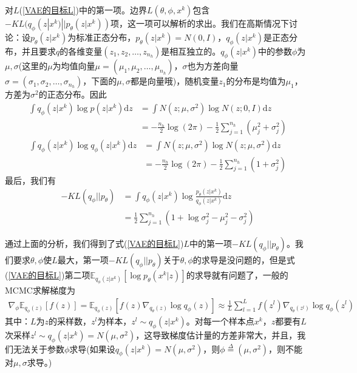            \par
            对$L$(\ref{VAE的目标L})中的第一项。边界$L(\theta,\phi,x^k)$包含$-KL(q_\phi(z|x^k)||p_\theta(z|x^k))$项，这一项可以解析的求出。我们在高斯情况下讨论：设$p_\theta(z|x^k)$为标准正态分布，$p_\theta(z|x^k) = N(0,I)$，$q_\phi(z|x^k)$是正态分布，并且要求$q$的各维变量$(z_1,z_2,\dots,z_{n_h})$是相互独立的。$q_\phi(z|x^k)$中的参数$\phi$为$\mu,\sigma$(这里的$\mu$为均值向量$\mu=(\mu_1,\mu_2,\dots,\mu_{n_h})$，$\sigma$也为方差向量$\sigma=(\sigma_1,\sigma_2,\dots,\sigma_{n_h})$，下面的$\mu,\sigma$都是向量哦)，随机变量$z_1$的分布是均值为$\mu_1$，方差为$\sigma^2$的正态分布。因此
            \begin{align*}
            \int q_\phi(z|x^k) \log p(z|x^k)\mathrm{d}z &= \int N(z;\mu,\sigma^2)\log N(z;0,I)\mathrm{d}z\\
            &= -\frac{n_h}{2} \log(2\pi) - \frac{1}{2} \sum_{j=1}^{n_h}(\mu_j^2+\sigma_j^2)
            \end{align*}
            \begin{align*}
            \int q_\phi(z|x^k) \log q_\phi(z|x^k)\mathrm{d}z &= \int N(z;\mu,\sigma^2)\log N(z;\mu,\sigma^2)\mathrm{d}z\\
            &= -\frac{n_h}{2} \log(2\pi) - \frac{1}{2} \sum_{j=1}^{n_h}(1+\sigma_j^2)
            \end{align*}
            最后，我们有
            \begin{align*}
            -KL(q_\phi||p_\theta) &= \int q_\phi(z|x^k)\log \frac{p_\theta(z|x^k)}{q_\phi(z|x^k)}\mathrm{d}z\\
            &= \frac{1}{2} \sum_{j=1}^{n_h} \left( 1+\log \sigma_j^2 -\mu_j^2- \sigma_j^2 \right)
            \end{align*}
            \par
            通过上面的分析，我们得到了式(\ref{VAE的目标L})$L$中的第一项$-KL(q_\phi||p_\theta)$。我们要求$\theta,\phi$使$L$最大，第一项$-KL(q_\phi||p_\theta)$关于$\theta,\phi$的求导是没问题的，但是式(\ref{VAE的目标L})第二项$\mathbb{E} _{q_\phi(z|x^k)} \left[ \log p_\theta(x^k|z) \right]$的求导就有问题了，一般的MCMC求解梯度为
            \begin{align*}
            \nabla_\phi \mathbb{E} _{q_\phi(z)} [f(z)] = \mathbb{E}_{q_\phi(z)} \left[ f(z)\nabla_{q_\theta(z)} \log q_\phi(z)  \right] \approx \frac{1}{L} \sum_{l=1}^L f(z^l)\nabla_{q_\theta(z^l)} \log q_\phi(z^l)
            \end{align*}
            其中：$L$为$z$的采样数，$z^l$为样本，$z^l\sim q_\phi(z|x^k)$。对每一个样本点$x^k$，$z$都要有$L$次采样$z^l \sim q_\phi(z|x^k) = N(\mu,\sigma^2)$，这导致梯度估计量的方差非常大，并且，我们无法关于参数$\phi$求导(如果设$q_\phi(z|x^k) = N(\mu,\sigma^2)$，则$\phi \overset{\Delta}{=}(\mu,\sigma^2)$，则不能对$\mu,\sigma$求导。)
